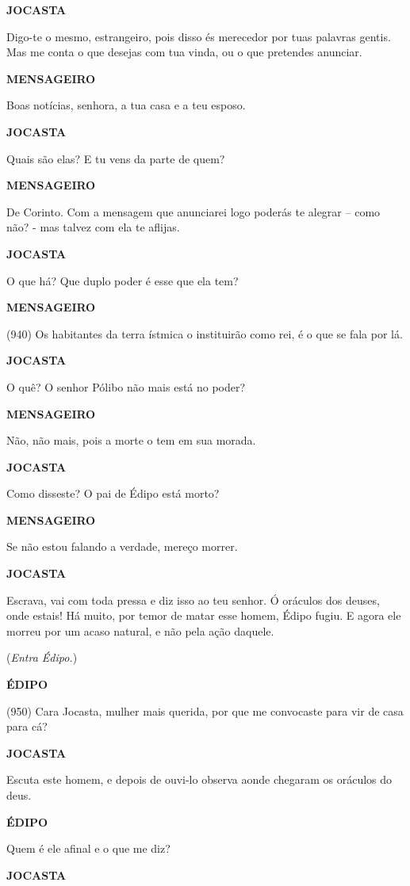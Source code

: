\textbf{JOCASTA}

Digo-te o mesmo, estrangeiro, pois disso és merecedor por tuas palavras
gentis. Mas me conta o que desejas com tua vinda, ou o que pretendes
anunciar.

\textbf{MENSAGEIRO}

Boas notícias, senhora, a tua casa e a teu esposo.

\textbf{JOCASTA}

Quais são elas? E tu vens da parte de quem?

\textbf{MENSAGEIRO}

De Corinto. Com a mensagem que anunciarei logo poderás te alegrar --
como não? - mas talvez com ela te aflijas.

\textbf{JOCASTA}

O que há? Que duplo poder é esse que ela tem?

\textbf{MENSAGEIRO}

(940) Os habitantes da terra ístmica o instituirão como rei, é o que se
fala por lá.

\textbf{JOCASTA}

O quê? O senhor Pólibo não mais está no poder?

\textbf{MENSAGEIRO}

Não, não mais, pois a morte o tem em sua morada.

\textbf{JOCASTA}

Como disseste? O pai de Édipo está morto?

\textbf{MENSAGEIRO}

Se não estou falando a verdade, mereço morrer.

\textbf{JOCASTA}

Escrava, vai com toda pressa e diz isso ao teu senhor. Ó oráculos dos
deuses, onde estais! Há muito, por temor de matar esse homem, Édipo
fugiu. E agora ele morreu por um acaso natural, e não pela ação daquele.

(\emph{Entra Édipo.})

\textbf{ÉDIPO}

(950) Cara Jocasta, mulher mais querida, por que me convocaste para vir
de casa para cá?

\textbf{JOCASTA}

Escuta este homem, e depois de ouvi-lo observa aonde chegaram os
oráculos do deus.

\textbf{ÉDIPO}

Quem é ele afinal e o que me diz?

\textbf{JOCASTA}

